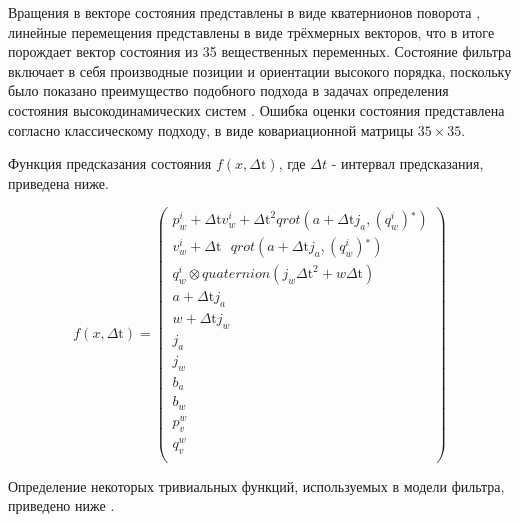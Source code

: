 \documentclass[12pt,a4paper]{article}
\begin{document}
Вращения в векторе состояния представлены в виде кватернионов поворота \cite{QuaternionsMadgwick}, линейные перемещения представлены в виде трёхмерных векторов, что в итоге порождает вектор состояния из 35 вещественных переменных. Состояние фильтра включает в себя производные позиции и ориентации высокого порядка, поскольку было показано преимущество подобного подхода в задачах определения состояния высокодинамических систем \cite{Kishore94}. Ошибка оценки состояния представлена согласно классическому подходу, в виде ковариационной матрицы $35 \times 35$.

Функция предсказания состояния $f(x,\text{$\Delta $t})$, где $\Delta t$ - интервал предсказания, приведена ниже.

\begin{equation}
    \label{eq:f}
    f(x,\text{$\Delta $t})=\left(
    \begin{array}{c}
    p_w^i+\text{$\Delta $t} v_w^i+\text{$\Delta $t}^2 qrot\left(a+\text{$\Delta $t} j_a,\left(q_w^i\right){}^*\right) \\
    v_w^i+\text{$\Delta $t} \text{ } qrot\left(a+\text{$\Delta $t} j_a,\left(q_w^i\right){}^*\right) \\
    q_w^i\otimes quaternion\left(j_w \text{$\Delta $t}^2+w \text{$\Delta $t}\right) \\
    a+\text{$\Delta $t} j_a \\
    w+\text{$\Delta $t} j_w \\
    j_a \\
    j_w \\
    b_a \\
    b_w \\
    p_v^w \\
    q_v^w \\
    \end{array}
    \right)
\end{equation}

Определение некоторых тривиальных функций, используемых в модели фильтра, приведено ниже \cite{QuaternionsMadgwick, QuaternionsNASA}.
\end{document}

